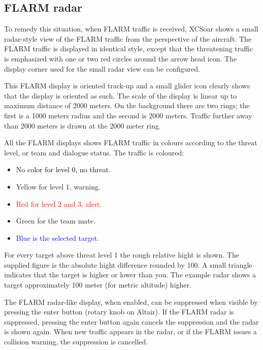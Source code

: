 \subsection*{FLARM radar}

To remedy this situation, when FLARM traffic is received, XCSoar shows a
small radar-style view of the FLARM
traffic from the perspective of the aircraft.  The FLARM traffic is
displayed in identical style, except that the threatening traffic is emphasized
with one or two red circles around the arrow head icon.  The display corner used
for the small radar view can be configured.

This FLARM display is oriented track-up and a small glider icon
clearly shows that the display is oriented as such.  The scale of the
display is linear up to maximum distance of 2000 meters.  On the
background there are two rings; the first is a 1000 meters radius and the second
is 2000 meters.  Traffic further away than 2000 meters is drawn at the 2000 meter ring.

All the FLARM displays shows FLARM traffic in colours according to
the threat level, or team and dialogue status.  The traffic is coloured:
\begin{itemize}
\item \textcolor{black} {No color for level 0, no threat.}
\item \textcolor{warning} { Yellow for level 1, warning.}
\item \textcolor{red} {Red for level 2 and 3, alert.}
\item \textcolor{teammate} {Green for the team mate.}
\item \textcolor{blue} {Blue is the selected target.}
\end{itemize}

For every target above threat level 1 the rough relative hight is shown. The
supplied figure is the absolute hight difference rounded by 100.  A small
triangle indicates that the target is higher or lower than you.  The example
radar shows a target approximately 100 meter (for metric altitude) higher.

The FLARM radar-like display, when enabled, can be suppressed when
visible by pressing the enter button (rotary knob on Altair).  If the
FLARM radar is suppressed, pressing the enter button again cancels the
suppression and the radar is shown again.  When new traffic appears in
the radar, or if the FLARM issues a collision warning, the suppression
is cancelled.

